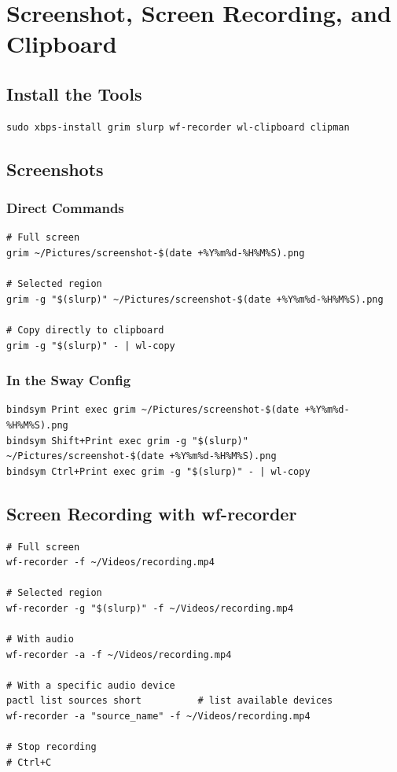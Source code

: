 \documentclass[12pt, a4paper]{book}
\begin{document}
\chapter{Screenshot, Screen Recording, and Clipboard}

\section{Install the Tools}
\begin{lstlisting}
sudo xbps-install grim slurp wf-recorder wl-clipboard clipman
\end{lstlisting}

\section{Screenshots}

\subsection{Direct Commands}
\begin{lstlisting}
# Full screen
grim ~/Pictures/screenshot-$(date +%Y%m%d-%H%M%S).png

# Selected region
grim -g "$(slurp)" ~/Pictures/screenshot-$(date +%Y%m%d-%H%M%S).png

# Copy directly to clipboard
grim -g "$(slurp)" - | wl-copy
\end{lstlisting}

\subsection{In the Sway Config}
\begin{lstlisting}
bindsym Print exec grim ~/Pictures/screenshot-$(date +%Y%m%d-%H%M%S).png
bindsym Shift+Print exec grim -g "$(slurp)" ~/Pictures/screenshot-$(date +%Y%m%d-%H%M%S).png
bindsym Ctrl+Print exec grim -g "$(slurp)" - | wl-copy
\end{lstlisting}

\section{Screen Recording with wf-recorder}
\begin{lstlisting}
# Full screen
wf-recorder -f ~/Videos/recording.mp4

# Selected region
wf-recorder -g "$(slurp)" -f ~/Videos/recording.mp4

# With audio
wf-recorder -a -f ~/Videos/recording.mp4

# With a specific audio device
pactl list sources short          # list available devices
wf-recorder -a "source_name" -f ~/Videos/recording.mp4

# Stop recording
# Ctrl+C
\end{lstlisting}
\end{document}
